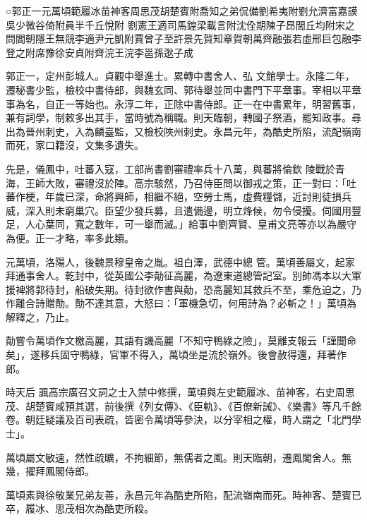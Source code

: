 
\begin{pinyinscope}

 ○郭正一元萬頃範履冰苗神客周思茂胡楚賓附喬知之弟侃備劉希夷附劉允濟富嘉謨吳少微谷倚附員半千丘悅附
 劉憲王適司馬鍠梁載言附沈佺期陳子昂閭丘均附宋之問閻朝隱王無競李適尹元凱附賈曾子至許景先賀知章賀朝萬齊融張若虛邢巨包融李登之附席豫徐安貞附齊浣王浣李邕孫逖子成



 郭正一，定州彭城人。貞觀中舉進士。累轉中書舍人、弘
 文館學士。永隆二年，遷秘書少監，檢校中書侍郎，與魏玄同、郭待舉並同中書門下平章事。宰相以平章事為名，自正一等始也。永淳二年，正除中書侍郎。正一在中書累年，明習舊事，兼有詞學，制敕多出其手，當時號為稱職。則天臨朝，轉國子祭酒，罷知政事。尋出為晉州刺史，入為麟臺監，又檢校陜州刺史。永昌元年，為酷史所陷，流配嶺南而死，家口籍沒，文集多遺失。



 先是，儀鳳中，吐蕃入寇，工部尚書劉審禮率兵十八萬，與蕃將倫欽
 陵戰於青海，王師大敗，審禮沒於陣。高宗駭然，乃召侍臣問以御戎之策，正一對曰：「吐蕃作梗，年歲已深，命將興師，相繼不絕，空勞士馬，虛費糧儲，近討則徒損兵威，深入則未窮巢穴。臣望少發兵募，且遣備邊，明立烽候，勿令侵擾。伺國用豐足，人心葉同，寬之數年，可一舉而滅。」給事中劉齊賢、皇甫文亮等亦以為嚴守為便。正一才略，率多此類。



 元萬頃，洛陽人，後魏景穆皇帝之胤。祖白澤，武德中總
 管。萬頃善屬文，起家拜通事舍人。乾封中，從英國公李勣征高麗，為遼東道總管記室。別帥馮本以大軍援裨將郭待封，船破失期。待封欲作書與勣，恐高麗知其救兵不至，乘危迫之，乃作離合詩贈勣。勣不達其意，大怒曰：「軍機急切，何用詩為？必斬之！」萬頃為解釋之，乃止。



 勣嘗令萬頃作文檄高麗，其語有譏高麗「不知守鴨綠之險」，莫離支報云「謹聞命矣」，遂移兵固守鴨綠，官軍不得入，萬頃坐是流於嶺外。後會赦得還，拜著作郎。



 時天后
 諷高宗廣召文詞之士入禁中修撰，萬頃與左史範履冰、苗神客，右史周思茂、胡楚賓咸預其選，前後撰《列女傳》、《臣軌》、《百僚新誡》、《樂書》等凡千餘卷。朝廷疑議及百司表疏，皆密令萬頃等參決，以分宰相之權，時人謂之「北門學士」。



 萬頃屬文敏速，然性疏曠，不拘細節，無儒者之風。則天臨朝，遷鳳閣舍人。無幾，擢拜鳳閣侍郎。



 萬頃素與徐敬業兄弟友善，永昌元年為酷吏所陷，配流嶺南而死。時神客、楚賓已卒，履冰、思茂相次為酷吏所殺。




\end{pinyinscope}
